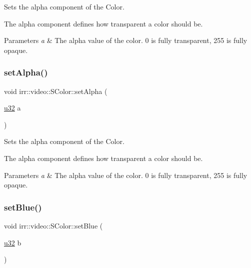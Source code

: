 Sets the alpha component of the Color. 

The alpha component defines how transparent a color should be. 
\begin{DoxyParams}{Parameters}
{\em a} & The alpha value of the color. 0 is fully transparent, 255 is fully opaque. \\
\hline
\end{DoxyParams}
\mbox{\label{classirr_1_1video_1_1SColor_a7bfe4abc30d563668b947c8bdb055bab}} 
\subsubsection{\texorpdfstring{set\+Alpha()}{setAlpha()}\hspace{0.1cm}{\footnotesize\ttfamily [2/2]}}
{\footnotesize\ttfamily void irr\+::video\+::\+S\+Color\+::set\+Alpha (\begin{DoxyParamCaption}\item[{\hyperlink{namespaceirr_a0416a53257075833e7002efd0a18e804}{u32}}]{a }\end{DoxyParamCaption})\hspace{0.3cm}{\ttfamily [inline]}}



Sets the alpha component of the Color. 

The alpha component defines how transparent a color should be. 
\begin{DoxyParams}{Parameters}
{\em a} & The alpha value of the color. 0 is fully transparent, 255 is fully opaque. \\
\hline
\end{DoxyParams}
\mbox{\label{classirr_1_1video_1_1SColor_a13d82e6b52d32f7394f3cce041dc2965}} 
\subsubsection{\texorpdfstring{set\+Blue()}{setBlue()}\hspace{0.1cm}{\footnotesize\ttfamily [1/2]}}
{\footnotesize\ttfamily void irr\+::video\+::\+S\+Color\+::set\+Blue (\begin{DoxyParamCaption}\item[{\hyperlink{namespaceirr_a0416a53257075833e7002efd0a18e804}{u32}}]{b }\end{DoxyParamCaption})\hspace{0.3cm}{\ttfamily [inline]}}



